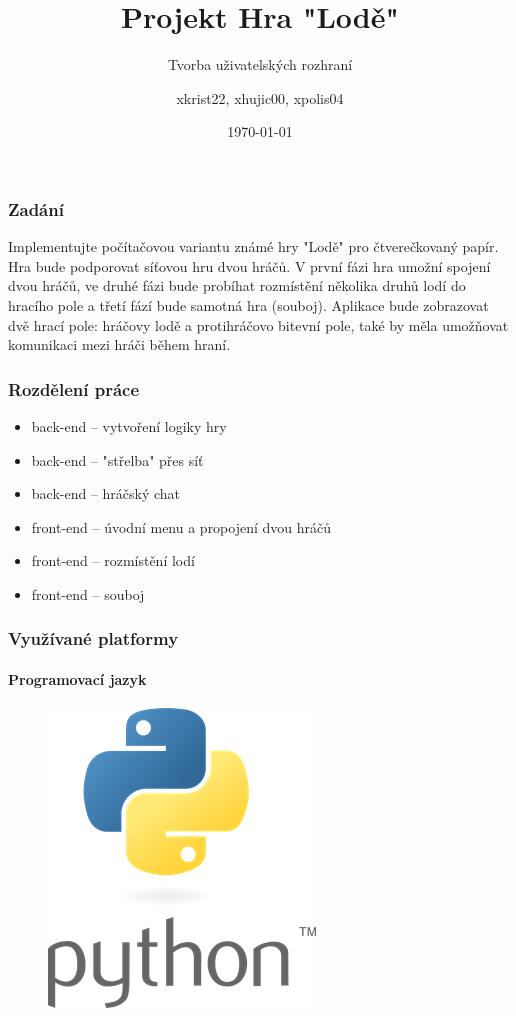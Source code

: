 \documentclass{beamer}
\title{Projekt Hra "Lodě"}
\subtitle{Tvorba uživatelských rozhraní}
\author{xkrist22, xhujic00, xpolis04}
\institute{FIT VUT}
\date{\today}
\begin{document}
	\begin{frame}
		\titlepage
	\end{frame}
	
	\begin{frame}
		\frametitle{Zadání}
Implementujte počítačovou variantu známé hry "Lodě" pro čtverečkovaný papír. Hra bude podporovat síťovou hru dvou hráčů. V první fázi hra umožní spojení dvou hráčů, ve druhé fázi bude probíhat rozmístění několika druhů lodí do hracího pole a třetí fází bude samotná hra (souboj). Aplikace bude zobrazovat dvě hrací pole: hráčovy lodě a protihráčovo bitevní pole, také by měla umožňovat komunikaci mezi hráči během hraní. 
	\end{frame}		

	\begin{frame}
		\frametitle{Rozdělení práce}
		\begin{itemize}
			\item back-end -- vytvoření logiky hry
			\item back-end -- "střelba" přes síť
			\item back-end -- hráčský chat
			\item front-end -- úvodní menu a propojení dvou hráčů
			\item front-end -- rozmístění lodí
			\item front-end -- souboj
		\end{itemize}
	\end{frame}		
			
	\begin{frame}
		\frametitle{Využívané platformy}
		\framesubtitle{Programovací jazyk}
		\begin{figure}[h]
		\centering
			\includegraphics[scale=0.5]{python_logo.png}
		\end{figure}
	\end{frame}
\end{document}
